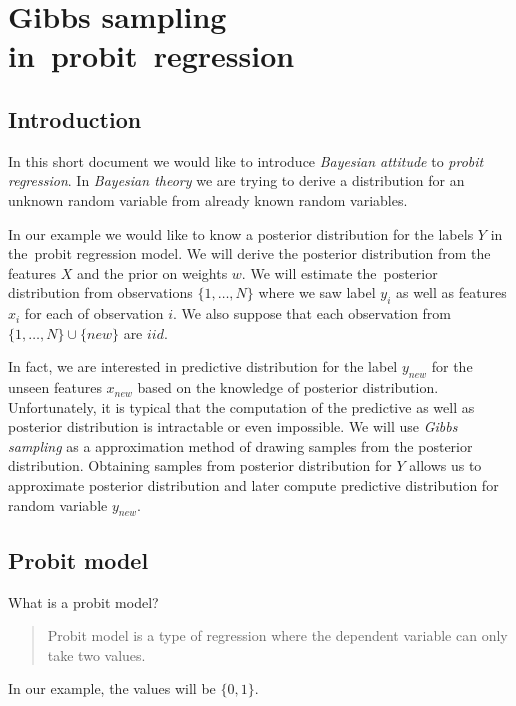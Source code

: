 

\chapter{Gibbs sampling in~probit~regression}
\label{cha:gibbs_sampling_for_probit_regression}


\section{Introduction} 
\label{sec:introduction}
In this short document we would like to introduce {\it Bayesian attitude} to {\it probit regression}. In {\it Bayesian theory} we are  trying to derive a distribution for an unknown random variable from already known random variables. 

In our example we would like to know a posterior distribution for the labels $Y$ in the~probit regression model. We will derive the posterior distribution from the features $X$ and the prior on weights $w$. We will estimate the~posterior distribution from observations $\{1,\ldots,N\}$ where we saw label $y_i$ as well as features $x_i$ for each of observation $i$. We also suppose that each observation from $\{1,\ldots,N\} \cup \{new\}$ are $iid$. 

In fact, we are interested in predictive distribution for the label $y_{new}$ for the unseen features $x_{new}$ based on the knowledge of posterior distribution. Unfortunately, it is typical that the computation of the predictive as well as posterior distribution is intractable or even impossible. We will use {\it Gibbs sampling} as a approximation method of drawing samples from the posterior distribution. Obtaining samples from posterior distribution for $Y$ allows us to approximate posterior distribution and later compute predictive distribution for random variable $y_{new}$.



\section{Probit model}
What is a probit model?
\begin{quotation}
    Probit model is a type of regression where the dependent variable can only take two values.
\end{quotation}\cite{wiki_probit}
In our example, the values will be $\{0,1\}$.

